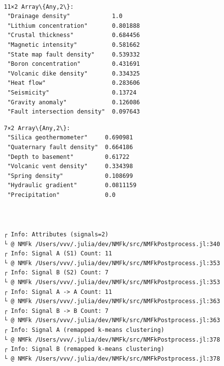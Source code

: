 \documentclass[11pt]{article}
\begin{document}
    \begin{Verbatim}[commandchars=\\\{\}]

    \end{Verbatim}

    \begin{center}
    \end{center}
    { \hspace*{\fill} \\}


    \begin{Verbatim}[commandchars=\\\{\}]
11×2 Array\{Any,2\}:
 "Drainage density"            1.0
 "Lithium concentration"       0.801888
 "Crustal thickness"           0.684456
 "Magnetic intensity"          0.581662
 "State map fault density"     0.539332
 "Boron concentration"         0.431691
 "Volcanic dike density"       0.334325
 "Heat flow"                   0.283606
 "Seismicity"                  0.13724
 "Gravity anomaly"             0.126086
 "Fault intersection density"  0.097643
    \end{Verbatim}



    \begin{Verbatim}[commandchars=\\\{\}]
7×2 Array\{Any,2\}:
 "Silica geothermometer"     0.690981
 "Quaternary fault density"  0.664186
 "Depth to basement"         0.61722
 "Volcanic vent density"     0.334398
 "Spring density"            0.108699
 "Hydraulic gradient"        0.0811159
 "Precipitation"             0.0
    \end{Verbatim}


    \begin{center}
    \end{center}
    { \hspace*{\fill} \\}

    \begin{Verbatim}[commandchars=\\\{\}]

    \end{Verbatim}

    \begin{Verbatim}[commandchars=\\\{\}]
┌ Info: Attributes (signals=2)
└ @ NMFk /Users/vvv/.julia/dev/NMFk/src/NMFkPostprocess.jl:340
┌ Info: Signal A (S1) Count: 11
└ @ NMFk /Users/vvv/.julia/dev/NMFk/src/NMFkPostprocess.jl:353
┌ Info: Signal B (S2) Count: 7
└ @ NMFk /Users/vvv/.julia/dev/NMFk/src/NMFkPostprocess.jl:353
┌ Info: Signal A -> A Count: 11
└ @ NMFk /Users/vvv/.julia/dev/NMFk/src/NMFkPostprocess.jl:363
┌ Info: Signal B -> B Count: 7
└ @ NMFk /Users/vvv/.julia/dev/NMFk/src/NMFkPostprocess.jl:363
┌ Info: Signal A (remapped k-means clustering)
└ @ NMFk /Users/vvv/.julia/dev/NMFk/src/NMFkPostprocess.jl:378
┌ Info: Signal B (remapped k-means clustering)
└ @ NMFk /Users/vvv/.julia/dev/NMFk/src/NMFkPostprocess.jl:378
    \end{Verbatim}
\end{document}
